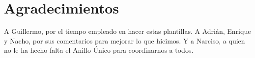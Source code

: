
\chapter*{Agradecimientos}

A Guillermo, por el tiempo empleado en hacer estas plantillas. A Adrián, Enrique y Nacho, por sus comentarios para mejorar lo que hicimos. Y a Narciso, a quien no le ha hecho falta el Anillo Único para coordinarnos a todos.









